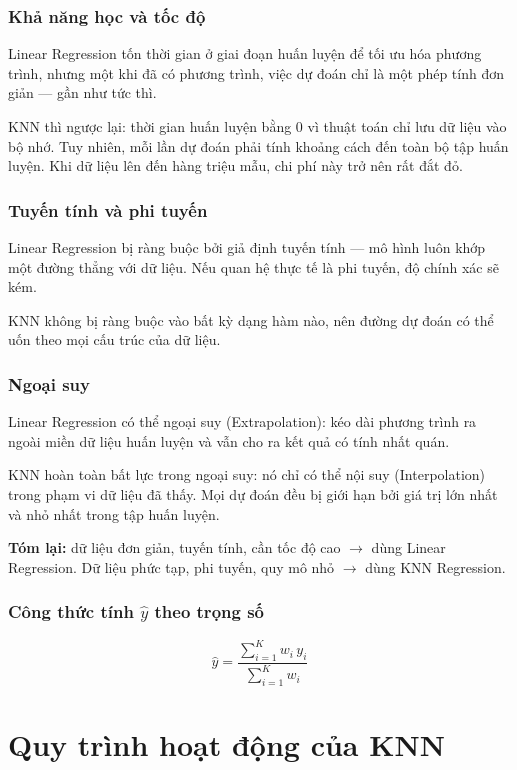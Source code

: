 \documentclass[12pt,a4paper]{article}
\begin{document}
\subsubsection{Khả năng học và tốc độ}

Linear Regression tốn thời gian ở giai đoạn huấn luyện để tối ưu hóa phương trình, nhưng một khi đã có phương trình, việc dự đoán chỉ là một phép tính đơn giản — gần như tức thì.

KNN thì ngược lại: thời gian huấn luyện bằng 0 vì thuật toán chỉ lưu dữ liệu vào bộ nhớ. Tuy nhiên, mỗi lần dự đoán phải tính khoảng cách đến toàn bộ tập huấn luyện. Khi dữ liệu lên đến hàng triệu mẫu, chi phí này trở nên rất đắt đỏ.

\subsubsection{Tuyến tính và phi tuyến}

Linear Regression bị ràng buộc bởi giả định tuyến tính — mô hình luôn khớp một đường thẳng với dữ liệu. Nếu quan hệ thực tế là phi tuyến, độ chính xác sẽ kém.

KNN không bị ràng buộc vào bất kỳ dạng hàm nào, nên đường dự đoán có thể uốn theo mọi cấu trúc của dữ liệu.

\subsubsection{Ngoại suy}

Linear Regression có thể ngoại suy (Extrapolation): kéo dài phương trình ra ngoài miền dữ liệu huấn luyện và vẫn cho ra kết quả có tính nhất quán.

KNN hoàn toàn bất lực trong ngoại suy: nó chỉ có thể nội suy (Interpolation) trong phạm vi dữ liệu đã thấy. Mọi dự đoán đều bị giới hạn bởi giá trị lớn nhất và nhỏ nhất trong tập huấn luyện.

\medskip
\noindent\textbf{Tóm lại:} dữ liệu đơn giản, tuyến tính, cần tốc độ cao $\to$ dùng Linear Regression. Dữ liệu phức tạp, phi tuyến, quy mô nhỏ $\to$ dùng KNN Regression.
\subsubsection{Công thức tính $\hat{y}$ theo trọng số}
\begin{equation}
    \hat{y} = \frac{\displaystyle\sum_{i=1}^{K} w_i\, y_i}
                   {\displaystyle\sum_{i=1}^{K} w_i}
\end{equation}
\section{Quy trình hoạt động của KNN}
\end{document}
